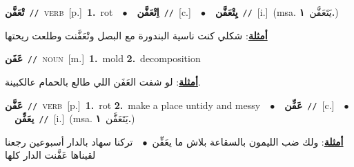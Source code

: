 \documentclass[10pt,a4paper,twoside]{article} %
\begin{document}
\begin{multicols}{2}
{\setlength\topsep{0pt}\textbf{\foreignlanguage{arabic}{تْعَفَّن}}\ {\color{gray}\texttt{//}\color{black}}\ \textsc{verb}\ [p.]\ \textbf{1.}~rot\ \ $\bullet$\ \ \setlength\topsep{0pt}\textbf{\foreignlanguage{arabic}{اِتْعَفَّن}}\ {\color{gray}\texttt{//}\color{black}}\ [c.]\ \ $\bullet$\ \ \setlength\topsep{0pt}\textbf{\foreignlanguage{arabic}{يِتْعَفَّن}}\ {\color{gray}\texttt{//}\color{black}}\ [i.]\ \color{gray}(msa. \foreignlanguage{arabic}{يَتَعَفَّن}~\foreignlanguage{arabic}{\textbf{١.}})\color{black}\  \begin{flushright}\color{gray}\foreignlanguage{arabic}{\textbf{\underline{\foreignlanguage{arabic}{أمثلة}}}: شكلي كنت ناسية البندورة مع البصل وتْعَفَّنت وطلعت ريحتها}\end{flushright}\color{black}} \vspace{2mm}

{\setlength\topsep{0pt}\textbf{\foreignlanguage{arabic}{عَفَن}}\ {\color{gray}\texttt{//}\color{black}}\ \textsc{noun}\ [m.]\ \textbf{1.}~mold  \textbf{2.}~decomposition\  \begin{flushright}\color{gray}\foreignlanguage{arabic}{\textbf{\underline{\foreignlanguage{arabic}{أمثلة}}}: لو شفت العَفَن اللي طالع بالحمام عالكبينة.}\end{flushright}\color{black}} \vspace{2mm}

{\setlength\topsep{0pt}\textbf{\foreignlanguage{arabic}{عَفَّن}}\ {\color{gray}\texttt{//}\color{black}}\ \textsc{verb}\ [p.]\ \textbf{1.}~rot  \textbf{2.}~make a place untidy and messy\ \ $\bullet$\ \ \setlength\topsep{0pt}\textbf{\foreignlanguage{arabic}{عَفِّن}}\ {\color{gray}\texttt{//}\color{black}}\ [c.]\ \ $\bullet$\ \ \setlength\topsep{0pt}\textbf{\foreignlanguage{arabic}{يعَفِّن}}\ {\color{gray}\texttt{//}\color{black}}\ [i.]\ \color{gray}(msa. \foreignlanguage{arabic}{يَتَعَفَّن}~\foreignlanguage{arabic}{\textbf{١.}})\color{black}\  \begin{flushright}\color{gray}\foreignlanguage{arabic}{\textbf{\underline{\foreignlanguage{arabic}{أمثلة}}}: ولك ضب الليمون بالسقاعة بلاش ما يعَفِّن\ $\bullet$\ \  تركنا سهاد بالدار أسبوعين رجعنا لقيناها عَفَّنت الدار كلها}\end{flushright}\color{black}} \vspace{2mm}


\end{multicols}
\end{document}
